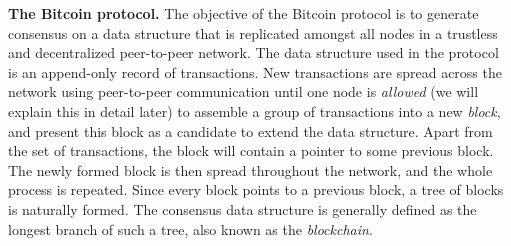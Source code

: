 




\smallskip
\noindent
{\bf The Bitcoin protocol.} The objective of the Bitcoin protocol is to generate consensus on a data structure that is replicated amongst all nodes in a trustless 
and decentralized peer-to-peer network. The data structure used in the protocol is an append-only record of transactions. New transactions are spread across the network using peer-to-peer communication until one node is \emph{allowed} (we will explain this in detail later) to assemble a group of transactions into a new \emph{block}, and present this block as a candidate to extend the data structure. Apart from the set of transactions, the block will contain a pointer to some previous block. The newly formed block is then spread throughout the network, and the whole process is repeated. Since every block points to a previous block, a tree of blocks is naturally formed. The consensus data structure is generally defined as the longest branch of such a tree, also known as the \emph{blockchain}.


